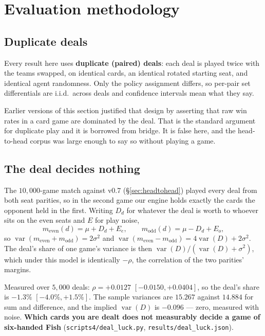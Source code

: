 \documentclass[11pt,a4paper]{article}
\begin{document}
\section{Evaluation methodology}
\label{sec:eval}

\subsection{Duplicate deals}

Every result here uses \textbf{duplicate (paired) deals}: each deal is played
twice with the teams swapped, on identical cards, an identical rotated starting
seat, and identical agent randomness. Only the policy assignment differs, so
per-pair set differentials are i.i.d.\ across deals and confidence intervals
mean what they say.

Earlier versions of this section justified that design by asserting that raw
win rates in a card game are dominated by the deal. That is the standard
argument for duplicate play and it is borrowed from bridge. It is false here,
and the head-to-head corpus was large enough to say so without playing a game.

\subsection{The deal decides nothing}
\label{sec:dealluck}

The $10{,}000$-game match against v0.7 (\S\ref{sec:headtohead}) played every deal
from both seat parities, so in the second game our engine holds exactly the
cards the opponent held in the first. Writing $D_d$ for whatever the deal is
worth to whoever sits on the even seats and $E$ for play noise,
%
\begin{equation}
m_{\text{even}}(d) = \mu + D_d + E_e,
\qquad
m_{\text{odd}}(d) = \mu - D_d + E_o ,
\end{equation}
%
so $\operatorname{var}(m_{\text{even}} + m_{\text{odd}}) = 2\sigma^2$ and
$\operatorname{var}(m_{\text{even}} - m_{\text{odd}}) = 4\operatorname{var}(D)
+ 2\sigma^2$. The deal's share of one game's variance is then
$\operatorname{var}(D)/(\operatorname{var}(D)+\sigma^2)$, which under this model
is identically $-\rho$, the correlation of the two parities' margins.

Measured over $5{,}000$ deals: $\rho = +0.0127$ $[-0.0150, +0.0404]$, so the
deal's share is $-1.3\%$ $[-4.0\%, +1.5\%]$. The sample variances are
$15.267$ against $14.884$ for sum and difference, and the implied
$\operatorname{var}(D)$ is $-0.096$ --- zero, measured with noise.
\textbf{Which cards you are dealt does not measurably decide a game of
six-handed Fish} (\texttt{scripts4/deal\_luck.py},
\texttt{results/deal\_luck.json}).
\end{document}
